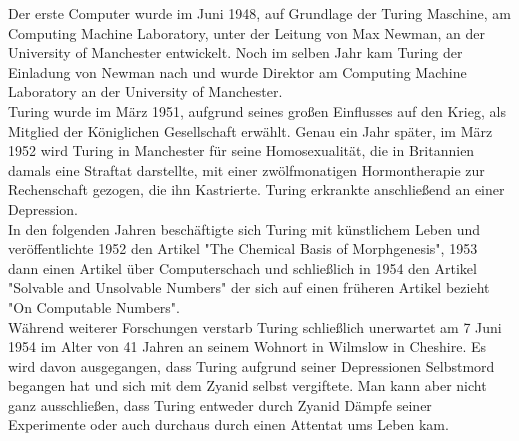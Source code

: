 Der erste Computer wurde im Juni 1948, auf Grundlage der Turing Maschine, am Computing Machine Laboratory, unter der Leitung von Max Newman, an der University of Manchester entwickelt. Noch im selben Jahr kam Turing der Einladung von Newman nach und wurde Direktor am Computing Machine Laboratory an der University of Manchester.\\
Turing wurde im März 1951, aufgrund seines großen Einflusses auf den Krieg, als Mitglied der Königlichen Gesellschaft erwählt.
Genau ein Jahr später, im März 1952 wird Turing in Manchester für seine Homosexualität, die in Britannien damals eine Straftat darstellte, mit einer zwölfmonatigen Hormontherapie zur Rechenschaft gezogen, die ihn Kastrierte. Turing erkrankte anschließend an einer Depression.\\
In den folgenden Jahren beschäftigte sich Turing mit künstlichem Leben und veröffentlichte 1952 den Artikel "The Chemical Basis of Morphgenesis", 1953 dann einen Artikel über Computerschach und schließlich in 1954 den Artikel "Solvable and Unsolvable Numbers" der sich auf einen früheren Artikel bezieht "On Computable Numbers".\\
Während weiterer Forschungen verstarb Turing schließlich unerwartet am 7 Juni 1954 im Alter von 41 Jahren an seinem Wohnort in Wilmslow in Cheshire. Es wird davon ausgegangen, dass Turing aufgrund seiner Depressionen Selbstmord begangen hat und sich mit dem Zyanid selbst vergiftete. Man kann aber nicht ganz ausschließen, dass Turing entweder durch Zyanid Dämpfe seiner Experimente oder auch durchaus durch einen Attentat ums Leben kam. 

